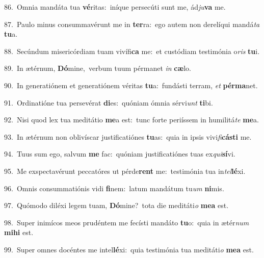 {\numbfont\textcolor{\numbcolor}{86.}}~Omnia mandáta tua \textbf{vé}\-ritas:~\star iníque persecúti sunt me, ád\-\textit{ju}\-\textbf{va} me.\par
{\numbfont\textcolor{\numbcolor}{87.}}~Paulo minus consummavérunt me in \textbf{ter}\-ra:~\star ego autem non derelíqui mandá\textit{ta} \textbf{tu}\-a.\par
{\numbfont\textcolor{\numbcolor}{88.}}~Secúndum misericórdiam tuam vivífi\textbf{ca} me:~\star et custódiam testimónia o\textit{ris} \textbf{tu}\-i.\par
{\numbfont\textcolor{\numbcolor}{89.}}~In ætérnum, \textbf{Dó}\-mine,~\star verbum tuum pérmanet \textit{in} \textbf{cæ}\-lo.\par
{\numbfont\textcolor{\numbcolor}{90.}}~In generatiónem et generatiónem véritas \textbf{tu}\-a:~\star fundásti terram, \textit{et} \textbf{pér}\-\textbf{ma}net.\par
{\numbfont\textcolor{\numbcolor}{91.}}~Ordinatióne tua persevérat \textbf{di}\-es:~\star quóniam ómnia sérvi\textit{unt} \textbf{ti}\-bi.\par
{\numbfont\textcolor{\numbcolor}{92.}}~Nisi quod lex tua meditátio \textbf{me}\-a est:~\star tunc forte periíssem in humilitá\textit{te} \textbf{me}\-a.\par
{\numbfont\textcolor{\numbcolor}{93.}}~In ætérnum non oblivíscar justificatiónes \textbf{tu}\-as:~\star quia in ipsis vivi\-\textit{fi}\-\textbf{cás}\textbf{ti} me.\par
{\numbfont\textcolor{\numbcolor}{94.}}~Tuus sum ego, salvum \textbf{me} fac:~\star quóniam justificatiónes tuas ex\-\textit{qui}\-\textbf{sí}vi.\par
{\numbfont\textcolor{\numbcolor}{95.}}~Me exspectavérunt peccatóres ut pérde\textbf{rent} me:~\star testimónia tua in\-\textit{tel}\-\textbf{lé}xi.\par
{\numbfont\textcolor{\numbcolor}{96.}}~Omnis consummatiónis vidi \textbf{fi}\-nem:~\star latum mandátum tu\textit{um} \textbf{ni}\-mis.\par
{\numbfont\textcolor{\numbcolor}{97.}}~Quómodo diléxi legem tuam, \textbf{Dó}\-mine?~\star tota die meditáti\textit{o} \textbf{me}\-\textbf{a} est.\par
{\numbfont\textcolor{\numbcolor}{98.}}~Super inimícos meos prudéntem me fecísti mandáto \textbf{tu}\-o:~\star quia in ætér\textit{num} \textbf{mi}\-\textbf{hi} est.\par
{\numbfont\textcolor{\numbcolor}{99.}}~Super omnes docéntes me intel\-\textbf{lé}\-xi:~\star quia testimónia tua meditáti\textit{o} \textbf{me}\-\textbf{a} est.\par
